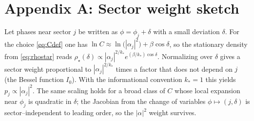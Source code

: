 \documentclass[10pt]{article}
\begin{document}
\section*{Appendix A: Sector weight sketch}
Let phases near sector $j$ be written as $\phi=\phi_j+\delta$ with a small deviation $\delta$. For the choice \eqref{eq:Cdef} one has
\( \ln C \approx \ln\big(|\alpha_j|^2\big) + \beta\cos\delta \), so the stationary density from \eqref{eq:rhostar} reads
\( \rho_\star(\delta) \propto |\alpha_j|^{2/k_*} e^{(\beta/k_*)\cos\delta} \).
Normalizing over $\delta$ gives a sector weight proportional to $|\alpha_j|^{2/k_*}$ times a factor that does not depend on $j$ (the Bessel function $I_0$). With the informational convention $k_*=1$ this yields $p_j\propto |\alpha_j|^2$. The same scaling holds for a broad class of $C$ whose local expansion near $\phi_j$ is quadratic in $\delta$; the Jacobian from the change of variables $\phi\mapsto (j,\delta)$ is sector--independent to leading order, so the $|\alpha|^2$ weight survives.
\end{document}

